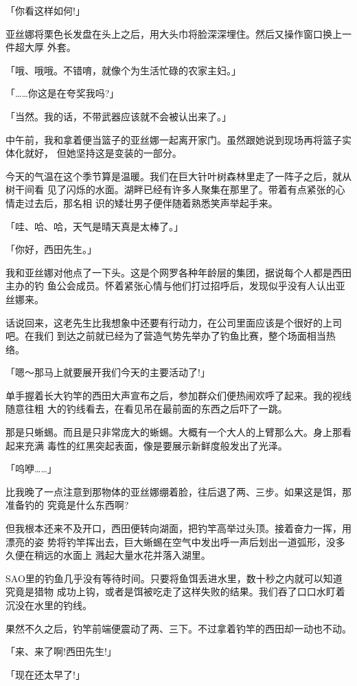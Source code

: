 \documentclass[11pt]{book}
\begin{document}
「你看这样如何!」

亚丝娜将栗色长发盘在头上之后，用大头巾将脸深深埋住。然后又操作窗口换上一件超大厚
外套。

「哦、哦哦。不错唷，就像个为生活忙碌的农家主妇。」

「……你这是在夸奖我吗?」

「当然。我的话，不带武器应该就不会被认出来了。」

中午前，我和拿着便当篮子的亚丝娜一起离开家门。虽然跟她说到现场再将篮子实体化就好，
但她坚持这是变装的一部分。

今天的气温在这个季节算是温暖。我们在巨大针叶树森林里走了一阵子之后，就从树干间看
见了闪烁的水面。湖畔已经有许多人聚集在那里了。带着有点紧张的心情走过去后，那名相
识的矮壮男子便伴随着熟悉笑声举起手来。

「哇、哈、哈，天气是晴天真是太棒了。」

「你好，西田先生。」

我和亚丝娜对他点了一下头。这是个网罗各种年龄层的集团，据说每个人都是西田主办的钓
鱼公会成员。怀着紧张心情与他们打过招呼后，发现似乎没有人认出亚丝娜来。

话说回来，这老先生比我想象中还要有行动力，在公司里面应该是个很好的上司吧。在我们
到达之前就已经为了营造气势先举办了钓鱼比赛，整个场面相当热络。

「嗯～那马上就要展开我们今天的主要活动了!」

单手握着长大钓竿的西田大声宣布之后，参加群众们便热闹欢呼了起来。我的视线随意往粗
大的钓线看去，在看见吊在最前面的东西之后吓了一跳。

那是只蜥蜴。而且是只非常庞大的蜥蜴。大概有一个大人的上臂那么大。身上那看起来充满
毒性的红黑突起表面，像是要展示新鲜度般发出了光泽。

「呜咿……」

比我晚了一点注意到那物体的亚丝娜绷着脸，往后退了两、三步。如果这是饵，那准备钓的
究竟是什么东西啊?

但我根本还来不及开口，西田便转向湖面，把钓竿高举过头顶。接着奋力一挥，用漂亮的姿
势将钓竿挥出去，巨大蜥蜴在空气中发出呼一声后划出一道弧形，没多久便在稍远的水面上
溅起大量水花并落入湖里。

SAO里的钓鱼几乎没有等待时间。只要将鱼饵丢进水里，数十秒之内就可以知道究竟是猎物
成功上钩，或者是饵被吃走了这样失败的结果。我们吞了口口水盯着沉没在水里的钓线。

果然不久之后，钓竿前端便震动了两、三下。不过拿着钓竿的西田却一动也不动。

「来、来了啊!西田先生!」

「现在还太早了!」
\end{document}
